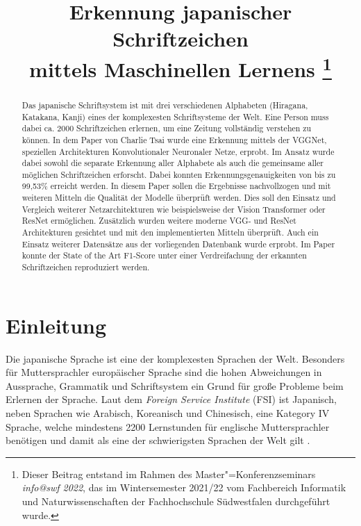 \documentclass[twoside,a4paper]{IEEEtran}
\begin{document}
\title{Erkennung japanischer Schriftzeichen \\mittels Maschinellen Lernens%
    \thanks{%
    Dieser Beitrag entstand im 
    Rahmen des Master"=Konferenzseminars \emph{info@swf 2022}, das im
    Wintersemester 2021/22 vom Fachbereich Informatik und
    Naturwissenschaften der Fachhochschule Südwestfalen
    durchgeführt wurde.}}
\author{
}

\maketitle


\begin{abstract}
Das japanische Schriftsystem ist mit drei verschiedenen Alphabeten (Hiragana, Katakana, Kanji) eines der komplexesten Schriftsysteme der Welt. Eine Person muss dabei ca. 2000 Schriftzeichen erlernen, um eine Zeitung vollständig verstehen zu können. In dem Paper \cite{RHC} von Charlie Tsai wurde eine Erkennung mittels der VGGNet, speziellen Architekturen Konvolutionaler Neuronaler Netze, erprobt. Im Ansatz wurde dabei sowohl die separate Erkennung aller Alphabete als auch die gemeinsame aller möglichen Schriftzeichen erforscht. Dabei konnten Erkennungsgenauigkeiten von bis zu 99,53\% erreicht werden. In diesem Paper sollen die Ergebnisse nachvollzogen und mit weiteren Mitteln die Qualität der Modelle überprüft werden. Dies soll den Einsatz und Vergleich weiterer Netzarchitekturen wie beispielsweise der Vision Transformer oder ResNet ermöglichen. Zusätzlich wurden weitere moderne VGG- und ResNet Architekturen gesichtet und mit den implementierten Mitteln überprüft. Auch ein Einsatz weiterer Datensätze aus der vorliegenden Datenbank wurde erprobt. Im Paper konnte der State of the Art F1-Score unter einer Verdreifachung der erkannten Schriftzeichen reproduziert werden.
\end{abstract}


\section{Einleitung}
Die japanische Sprache ist eine der komplexesten Sprachen der Welt. Besonders für Muttersprachler europäischer Sprache sind die hohen Abweichungen in Aussprache, Grammatik und Schriftsystem ein Grund für große Probleme beim Erlernen der Sprache. Laut dem \emph{Foreign Service Institute} (FSI) ist Japanisch, neben Sprachen wie Arabisch, Koreanisch und Chinesisch, eine Kategory IV Sprache, welche mindestens 2200 Lernstunden für englische Muttersprachler benötigen und damit als eine der schwierigsten Sprachen der Welt gilt \cite{FSI}.
\end{document}
